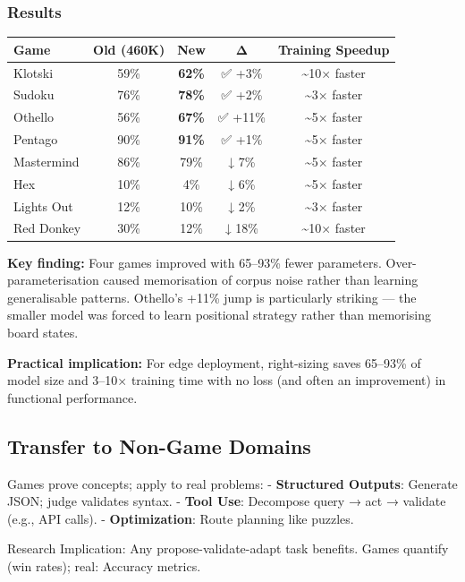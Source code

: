 \documentclass[
]{article}
\begin{document}
\subsubsection{Results}\label{results}

\begin{longtable}[]{@{}lcccc@{}}
\toprule\noalign{}
Game & Old (460K) & New & Δ & Training Speedup \\
\midrule\noalign{}
\endhead
\bottomrule\noalign{}
\endlastfoot
Klotski & 59\% & \textbf{62\%} & ✅ +3\% & \textasciitilde10× faster \\
Sudoku & 76\% & \textbf{78\%} & ✅ +2\% & \textasciitilde3× faster \\
Othello & 56\% & \textbf{67\%} & ✅ +11\% & \textasciitilde5× faster \\
Pentago & 90\% & \textbf{91\%} & ✅ +1\% & \textasciitilde5× faster \\
Mastermind & 86\% & 79\% & ↓ 7\% & \textasciitilde5× faster \\
Hex & 10\% & 4\% & ↓ 6\% & \textasciitilde5× faster \\
Lights Out & 12\% & 10\% & ↓ 2\% & \textasciitilde3× faster \\
Red Donkey & 30\% & 12\% & ↓ 18\% & \textasciitilde10× faster \\
\end{longtable}

\textbf{Key finding:} Four games improved with 65--93\% fewer
parameters. Over-parameterisation caused memorisation of corpus noise
rather than learning generalisable patterns. Othello's +11\% jump is
particularly striking --- the smaller model was forced to learn
positional strategy rather than memorising board states.

\textbf{Practical implication:} For edge deployment, right-sizing saves
65--93\% of model size and 3--10× training time with no loss (and often
an improvement) in functional performance.

\subsection{Transfer to Non-Game
Domains}\label{transfer-to-non-game-domains}

Games prove concepts; apply to real problems: - \textbf{Structured
Outputs}: Generate JSON; judge validates syntax. - \textbf{Tool Use}:
Decompose query → act → validate (e.g., API calls). -
\textbf{Optimization}: Route planning like puzzles.

Research Implication: Any propose-validate-adapt task benefits. Games
quantify (win rates); real: Accuracy metrics.
\end{document}
